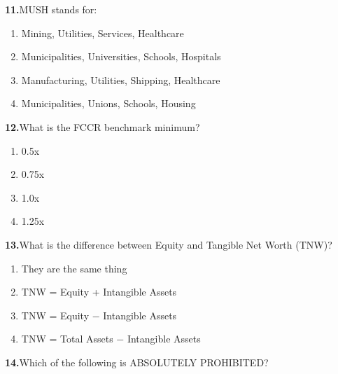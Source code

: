 \documentclass[11pt,letterpaper]{article}
\newif\ifshowsolutions
\newcommand{\answer}[1]{%
  \ifshowsolutions
    \begin{tcolorbox}[colback=green!5!white, colframe=answergreen, title={\small\textbf{Answer}}, fonttitle=\color{white}, coltitle=white, colbacktitle=answergreen, boxrule=0.5pt, arc=2pt, left=4pt, right=4pt, top=2pt, bottom=2pt]
    {\small #1}
    \end{tcolorbox}
  \fi
}
\begin{document}
\vspace{0.5em}

\noindent\textbf{11.}\quad MUSH stands for:

\begin{enumerate}[label=\Alph*), leftmargin=2em, itemsep=0pt]
\item Mining, Utilities, Services, Healthcare
\item Municipalities, Universities, Schools, Hospitals
\item Manufacturing, Utilities, Shipping, Healthcare
\item Municipalities, Unions, Schools, Housing
\end{enumerate}
\answer{B) Municipalities, Universities, Schools, and Hospitals. \$0 auto-decision, max amort 96 months, max term 72 months.}

\vspace{0.5em}

\noindent\textbf{12.}\quad What is the FCCR benchmark minimum?

\begin{enumerate}[label=\Alph*), leftmargin=2em, itemsep=0pt]
\item 0.5x
\item 0.75x
\item 1.0x
\item 1.25x
\end{enumerate}
\answer{C) 1.0x. Fixed Charge Coverage Ratio must be at least 1.0x --- the company must cover all fixed obligations.}

\vspace{0.5em}

\noindent\textbf{13.}\quad What is the difference between Equity and Tangible Net Worth (TNW)?

\begin{enumerate}[label=\Alph*), leftmargin=2em, itemsep=0pt]
\item They are the same thing
\item TNW = Equity + Intangible Assets
\item TNW = Equity $-$ Intangible Assets
\item TNW = Total Assets $-$ Intangible Assets
\end{enumerate}
\answer{C) TNW = Equity $-$ Intangible Assets. Credit analysts prefer TNW because intangibles can't be liquidated.}

\vspace{0.5em}

\noindent\textbf{14.}\quad Which of the following is ABSOLUTELY PROHIBITED?
\end{document}
